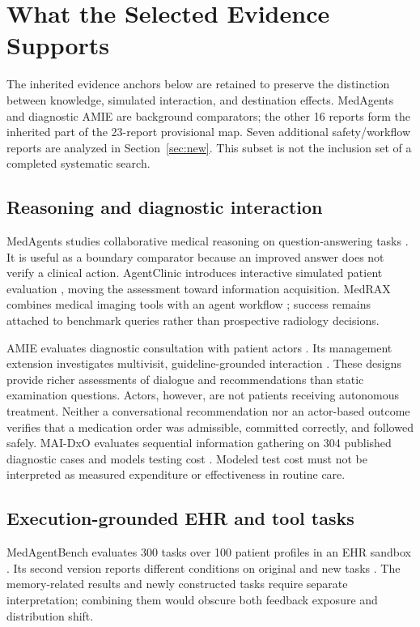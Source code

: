 \section{What the Selected Evidence Supports}
The inherited evidence anchors below are retained to preserve the distinction between knowledge, simulated interaction, and destination effects. MedAgents and diagnostic AMIE are background comparators; the other 16 reports form the inherited part of the 23-report provisional map. Seven additional safety/workflow reports are analyzed in Section~\ref{sec:new}. This subset is not the inclusion set of a completed systematic search.



\subsection{Reasoning and diagnostic interaction}
MedAgents studies collaborative medical reasoning on question-answering tasks \cite{medagents2024}. It is useful as a boundary comparator because an improved answer does not verify a clinical action. AgentClinic introduces interactive simulated patient evaluation \cite{agentclinic2026}, moving the assessment toward information acquisition. MedRAX combines medical imaging tools with an agent workflow \cite{medrax2025}; success remains attached to benchmark queries rather than prospective radiology decisions.

AMIE evaluates diagnostic consultation with patient actors \cite{amie2025}. Its management extension investigates multivisit, guideline-grounded interaction \cite{amiemanagement2026}. These designs provide richer assessments of dialogue and recommendations than static examination questions. Actors, however, are not patients receiving autonomous treatment. Neither a conversational recommendation nor an actor-based outcome verifies that a medication order was admissible, committed correctly, and followed safely. MAI-DxO evaluates sequential information gathering on 304 published diagnostic cases and models testing cost \cite{maid2025}. Modeled test cost must not be interpreted as measured expenditure or effectiveness in routine care.

\subsection{Execution-grounded EHR and tool tasks}
MedAgentBench evaluates 300 tasks over 100 patient profiles in an EHR sandbox \cite{medagentbench2025}. Its second version reports different conditions on original and new tasks \cite{medagentbenchv2}. The memory-related results and newly constructed tasks require separate interpretation; combining them would obscure both feedback exposure and distribution shift.

